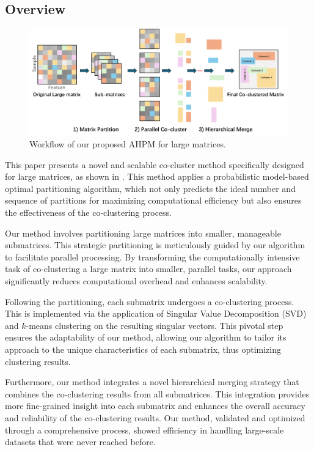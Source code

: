 \documentclass[letterpaper, 10 pt, conference]{ieeeconf}  %
\begin{document}
\subsection{Overview}

\begin{figure}[htbp]
    \centering
    \includegraphics[width=0.8\linewidth]{workflow.png}
    \caption{Workflow of our proposed AHPM for large matrices.}
    \label{fig:workflow}
\end{figure}
This paper presents a novel and scalable co-cluster method specifically designed for large matrices, as shown in . This method applies a probabilistic model-based optimal partitioning algorithm, which not only predicts the ideal number and sequence of partitions for maximizing computational efficiency but also ensures the effectiveness of the co-clustering process.

Our method involves partitioning large matrices into smaller, manageable submatrices. This strategic partitioning is meticulously guided by our algorithm to facilitate parallel processing. By transforming the computationally intensive task of co-clustering a large matrix into smaller, parallel tasks, our approach significantly reduces computational overhead and enhances scalability.

Following the partitioning, each submatrix undergoes a co-clustering process. This is implemented via the application of Singular Value Decomposition (SVD) and $k$-means clustering on the resulting singular vectors. This pivotal step ensures the adaptability of our method, allowing our algorithm to tailor its approach to the unique characteristics of each submatrix, thus optimizing clustering results.

Furthermore, our method integrates a novel hierarchical merging strategy that combines the co-clustering results from all submatrices. This integration provides more fine-grained insight into each submatrix and enhances the overall accuracy and reliability of the co-clustering results. Our method, validated and optimized through a comprehensive process, showed efficiency in handling large-scale datasets that were never reached before.
\end{document}
